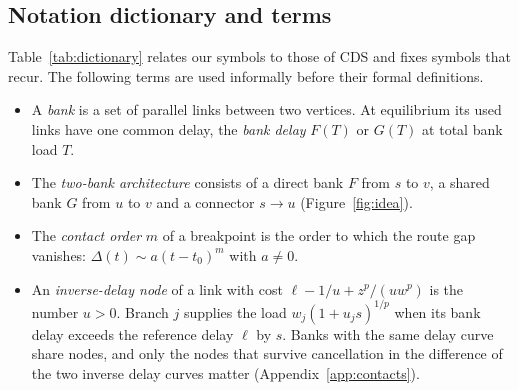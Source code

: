 \subsection{Notation dictionary and terms}

Table~\ref{tab:dictionary} relates our symbols to those of CDS and fixes symbols that recur. The following terms are used informally before their formal definitions.
\begin{itemize}[nosep]
\item A \emph{bank} is a set of parallel links between two vertices. At equilibrium its used links have one common delay, the \emph{bank delay} $F(T)$ or $G(T)$ at total bank load $T$.
\item The \emph{two-bank architecture} consists of a direct bank $F$ from $s$ to $v$, a shared bank $G$ from $u$ to $v$ and a connector $s\to u$ (Figure~\ref{fig:idea}).
\item The \emph{contact order} $m$ of a breakpoint is the order to which the route gap vanishes: $\Delta(t)\sim a(t-t_0)^m$ with $a\ne0$.
\item An \emph{inverse-delay node} of a link with cost $\ell-1/u+z^p/(uw^p)$ is the number $u>0$. Branch $j$ supplies the load $w_j(1+u_js)^{1/p}$ when its bank delay exceeds the reference delay $\ell$ by $s$. Banks with the same delay curve share nodes, and only the nodes that survive cancellation in the difference of the two inverse delay curves matter (Appendix~\ref{app:contacts}).
\end{itemize}

